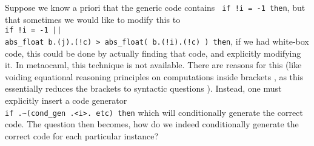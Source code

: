 \documentclass[11pt]{elsart}
\begin{document}
Suppose we know a priori that the generic code contains 
\verb+ if !i = -1 then+, but that sometimes we would like to modify
this to\\
{\small\verb+if !i = -1 ||+\\
\verb+abs_float b.(j).(!c) > abs_float( b.(!i).(!c) ) then+},
if we had white-box code, this could be done by actually finding that code,
and explicitly modifying it.  In metaocaml, this technique is not available.
There are reasons for this (like voiding equational reasoning principles
on computations inside brackets \cite{TahaThesis}, as this essentially
reduces the brackets to syntactic questions \cite{SICP}).
Instead, one must explicitly insert a code generator\\
\verb+if .~(cond_gen .<i>. etc) then+ which will conditionally generate
the correct code.  The question then becomes, how do we indeed 
conditionally generate the correct code for each particular instance?
\end{document}
